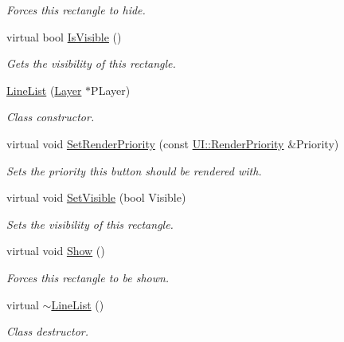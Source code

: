 \begin{DoxyCompactItemize}
\begin{DoxyCompactList}\small\item\em Forces this rectangle to hide. \item\end{DoxyCompactList}\item 
virtual bool \hyperlink{classMezzanine_1_1UI_1_1LineList_a887ee9e85f989a907b1d74ba95ed6a41}{IsVisible} ()
\begin{DoxyCompactList}\small\item\em Gets the visibility of this rectangle. \item\end{DoxyCompactList}\item 
\hyperlink{classMezzanine_1_1UI_1_1LineList_a250e9a87fbe68f2251510dbad2f15b08}{LineList} (\hyperlink{classMezzanine_1_1UI_1_1Layer}{Layer} $\ast$PLayer)
\begin{DoxyCompactList}\small\item\em Class constructor. \item\end{DoxyCompactList}\item 
virtual void \hyperlink{classMezzanine_1_1UI_1_1LineList_a42955b53aa178e4e1a40fd4b8c260bbe}{SetRenderPriority} (const \hyperlink{namespaceMezzanine_1_1UI_ac4c753eb6b5d66350a243acc9ce54130}{UI::RenderPriority} \&Priority)
\begin{DoxyCompactList}\small\item\em Sets the priority this button should be rendered with. \item\end{DoxyCompactList}\item 
virtual void \hyperlink{classMezzanine_1_1UI_1_1LineList_ace36d0bc1c9c465737b65c8f2bcc2d23}{SetVisible} (bool Visible)
\begin{DoxyCompactList}\small\item\em Sets the visibility of this rectangle. \item\end{DoxyCompactList}\item 
\hypertarget{classMezzanine_1_1UI_1_1LineList_a1832190fc3111d58b8e086f2cc358fdc}{
virtual void \hyperlink{classMezzanine_1_1UI_1_1LineList_a1832190fc3111d58b8e086f2cc358fdc}{Show} ()}
\label{classMezzanine_1_1UI_1_1LineList_a1832190fc3111d58b8e086f2cc358fdc}

\begin{DoxyCompactList}\small\item\em Forces this rectangle to be shown. \item\end{DoxyCompactList}\item 
\hypertarget{classMezzanine_1_1UI_1_1LineList_a1b87085b800ead91bc1bfec4d133039b}{
virtual \hyperlink{classMezzanine_1_1UI_1_1LineList_a1b87085b800ead91bc1bfec4d133039b}{$\sim$LineList} ()}
\label{classMezzanine_1_1UI_1_1LineList_a1b87085b800ead91bc1bfec4d133039b}

\begin{DoxyCompactList}\small\item\em Class destructor. \item\end{DoxyCompactList}\end{DoxyCompactItemize}
